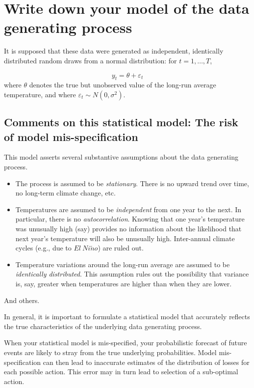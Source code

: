 \documentclass[
]{book}
\begin{document}
\hypertarget{white-noise-model}{%
\section{Write down your model of the data generating process}\label{white-noise-model}}

It is supposed that these data were generated as independent, identically distributed random draws from a normal distribution: for \(t = 1, \ldots, T\),

\[y_t = \theta + \varepsilon_t\]
where \(\theta\) denotes the true but unobserved value of the long-run average temperature, and where \(\varepsilon_t \sim N(0, \sigma^2)\).

\hypertarget{comments-on-this-statistical-model-the-risk-of-model-mis-specification}{%
\subsection{Comments on this statistical model: The risk of model mis-specification}\label{comments-on-this-statistical-model-the-risk-of-model-mis-specification}}

This model asserts several substantive assumptions about the data generating process.

\begin{itemize}
\item
  The process is assumed to be \emph{stationary}. There is no upward trend over time, no long-term climate change, etc.
\item
  Temperatures are assumed to be \emph{independent} from one year to the next. In particular, there is no \emph{autocorrelation}. Knowing that one year's temperature was unusually high (say) provides no information about the likelihood that next year's temperature will also be unusually high. Inter-annual climate cycles (e.g., due to \(El\ Ni\tilde{n}o\)) are ruled out.
\item
  Temperature variations around the long-run average are assumed to be \emph{identically distributed}. This assumption rules out the possibility that variance is, say, greater when temperatures are higher than when they are lower.
\end{itemize}

And others.

In general, it is important to formulate a statistical model that accurately reflects the true characteristics of the underlying data generating process.

When your statistical model is mis-specified, your probabilistic forecast of future events are likely to stray from the true underlying probabilities. Model mis-specification can then lead to inaccurate estimates of the distribution of losses for each possible action. This error may in turn lead to selection of a sub-optimal action.
\end{document}
